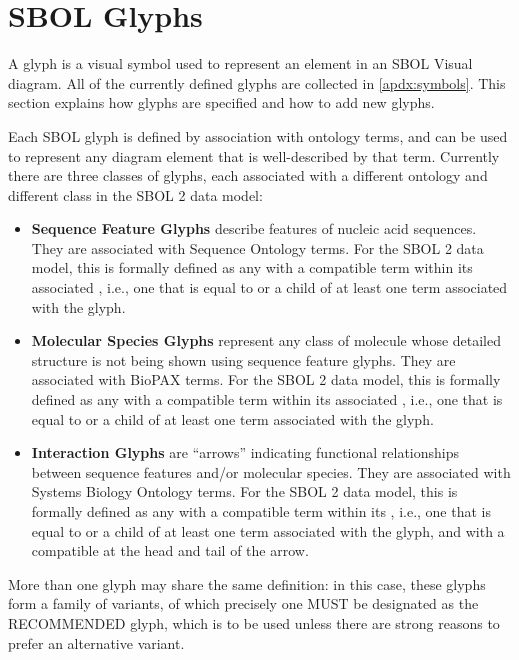 \section{SBOL Glyphs}\label{sec:glyphs}

A glyph is a visual symbol used to represent an element in an SBOL Visual diagram.
All of the currently defined glyphs are collected in \ref{apdx:symbols}.
%
This section explains how glyphs are specified and how to add new glyphs.

Each SBOL glyph is defined by association with ontology terms, and can be used to represent any diagram element that is well-described by that term.
Currently there are three classes of glyphs, each associated with a different ontology and different class in the SBOL 2 data model:
\begin{itemize}
\item {\bf Sequence Feature Glyphs} describe features of nucleic acid sequences. They are associated with Sequence Ontology terms.
For the SBOL 2 data model, this is formally defined as any  with a compatible term within its associated ,
 i.e., one that is equal to or a child of at least one term associated with the glyph.
\item {\bf Molecular Species Glyphs} represent any class of molecule whose detailed structure is not being shown using sequence feature glyphs. They are associated with BioPAX terms.  For the SBOL 2 data model, this is formally defined as any  with a compatible term within its associated ,
 i.e., one that is equal to or a child of at least one term associated with the glyph.
\item {\bf Interaction Glyphs} are ``arrows'' indicating functional relationships between sequence features and/or molecular species. They are associated with Systems Biology Ontology terms.
For the SBOL 2 data model, this is formally defined as any  with a compatible term within its ,
 i.e., one that is equal to or a child of at least one term associated with the glyph, 
 and with a compatible  at the head and tail of the arrow.
 \end{itemize}
 
More than one glyph may share the same definition: in this case, these glyphs form a family of variants, of which precisely one MUST be designated as the RECOMMENDED glyph, which is to be used unless there are strong reasons to prefer an alternative variant.

